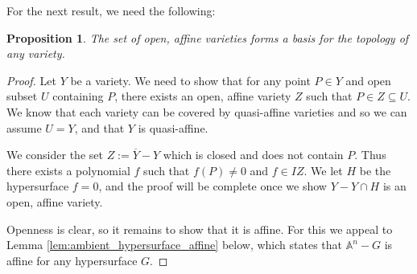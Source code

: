 \documentclass[12pt]{article}
\theoremstyle{plain}
\newtheorem{proposition}[thm]{Proposition}
\theoremstyle{definition}
\newcommand{\bb}[1]{\mathbb{#1}}
\begin{document}
For the next result, we need the following:
\begin{proposition}\label{prop:base}
The set of open, affine varieties forms a basis for the topology of any variety.
\end{proposition}
\begin{proof}
Let $Y$ be a variety. We need to show that for any point $P \in Y$ and open subset $U$ containing $P$, there exists an open, affine variety $Z$ such that $P \in Z \subseteq U$. We know that each variety can be covered by quasi-affine varieties and so we can assume $U = Y$, and that $Y$ is quasi-affine. 

We consider the set $Z := \overline{Y} - Y$ which is closed and does not contain $P$. Thus there exists a polynomial $f$ such that $f(P) \neq 0$ and $f \in IZ$. We let $H$ be the hypersurface $f = 0$, and the proof will be complete once we show $Y - Y \cap H$ is an open, affine variety.

Openness is clear, so it remains to show that it is affine. For this we appeal to Lemma \ref{lem:ambient_hypersurface_affine} below, which states that $\bb{A}^n - G$ is affine for any hypersurface $G$. 


\end{proof}
\end{document}
